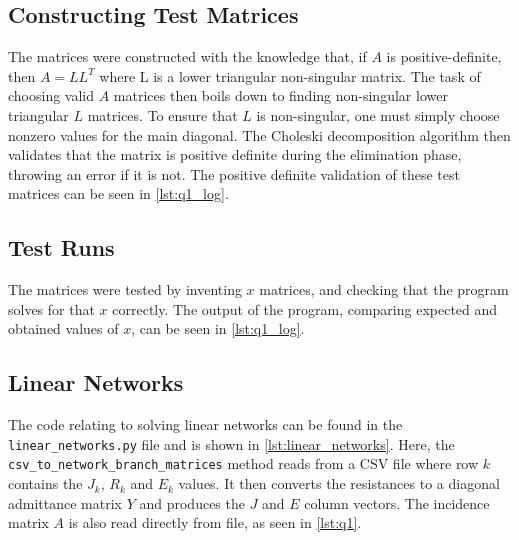 \documentclass[a4paper,titlepage]{article}
\begin{document}
	
	\subsection{Constructing Test Matrices}
	
	The matrices were constructed with the knowledge that, if $A$ is positive-definite, then $A = LL^T$ where L is a lower triangular non-singular matrix. The task of choosing valid $A$ matrices then boils down to finding non-singular lower triangular $L$ matrices. To ensure that $L$ is non-singular, one must simply choose nonzero values for the main diagonal. The Choleski decomposition algorithm then validates that the matrix is positive definite during the elimination phase, throwing an error if it is not. The positive definite validation of these test matrices can be seen in \autoref{lst:q1_log}.
	
	\subsection{Test Runs}
	
	The matrices were tested by inventing $x$ matrices, and checking that the program solves for that $x$ correctly. The output of the program, comparing expected and obtained values of $x$, can be seen in \autoref{lst:q1_log}.
	
	\subsection{Linear Networks}
	
	The code relating to solving linear networks can be found in the \texttt{linear_networks.py} file and is shown in \autoref{lst:linear_networks}. Here, the \texttt{csv_to_network_branch_matrices} method reads from a CSV file where row $k$ contains the $J_k$, $R_k$ and $E_k$ values. It then converts the resistances to a diagonal admittance matrix $Y$ and produces the $J$ and $E$ column vectors. The incidence matrix $A$ is also read directly from file, as seen in \autoref{lst:q1}.
	
\end{document}
